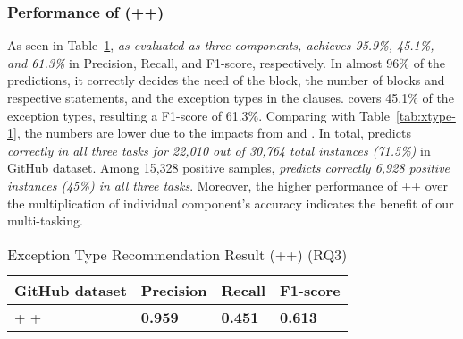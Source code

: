 \subsubsection{Performance of {\tool} ({\xblock}+{\xstate}+{\xtype})}

As seen in Table~\ref{tab:xtype-4}, {\em {\tool} as evaluated as three
  components, achieves 95.9\%, 45.1\%, and 61.3\%} in Precision,
Recall, and F1-score, respectively. In almost 96\% of the predictions,
it correctly decides the need of the  block, the
number of blocks and respective statements, and the exception types
in the  clauses. {\tool} covers 45.1\% of the exception
types, resulting a F1-score of 61.3\%.
%
Comparing with Table~\ref{tab:xtype-1}, the numbers are lower due
to the impacts from \xblock and \xstate. In total,
{\tool} predicts {\em correctly in all three tasks for 22,010 out of
  30,764 total instances (71.5\%)} in GitHub dataset. Among 15,328
positive samples, {\em {\tool} predicts correctly 6,928 positive
  instances (45\%) in all three tasks}. Moreover, the higher
performance of {\xblock}+{\xstate}+{\xtype} over the multiplication of
individual component's accuracy indicates the benefit of our
multi-tasking.


\begin{table}[htpb]
  \caption{Exception Type Recommendation Result ({\xblock}+{\xstate}+{\xtype}) (RQ3)}
  \vspace{-12pt}
  \small
	\begin{center}
		\renewcommand{\arraystretch}{1}
		\begin{tabular}{| p{3.10cm}<{\centering} | p{1.2cm}<{\centering} | p{1.2cm}<{\centering}| p{1.2cm}<{\centering}|}
		  \hline
			GitHub dataset  & Precision  & Recall & F1-score \\
			\hline
			\xblock + \xstate  + \xtype  & {\bf 0.959}  &  {\bf 0.451} & {\bf 0.613}\\
			\hline
		\end{tabular}
		\label{tab:xtype-4}
	\end{center}
\end{table}
